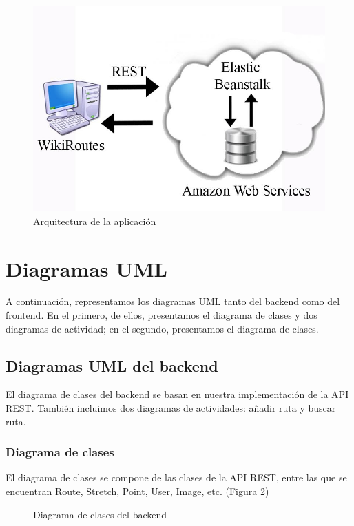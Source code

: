 \documentclass[11pt,a4paper]{article}
\begin{document}
\begin{figure}[htbp]
\centering
\includegraphics[width=0.7\linewidth]{imagenes/arquitectura}
\caption{Arquitectura de la aplicación}
\label{fig:arquitectura}
\end{figure}


\clearpage

\section{Diagramas UML}

A continuación, representamos los diagramas UML tanto del backend como del frontend. En el primero, de ellos, presentamos el diagrama de clases y dos diagramas de actividad; en el segundo, presentamos el diagrama de clases.

\subsection{Diagramas UML del backend}

El diagrama de clases del backend se basan en nuestra implementación de la API REST. También incluimos dos diagramas de actividades: añadir ruta y buscar ruta.  

\subsubsection{Diagrama de clases}

El diagrama de clases se compone de las clases de la API REST, entre las que se encuentran Route, Stretch, Point, User, Image, etc. (Figura \ref{fig:clases_backend})

\begin{figure}
\centering
\clasesbackend
\caption{Diagrama de clases del backend}
\label{fig:clases_backend}
\end{figure}
\end{document}
